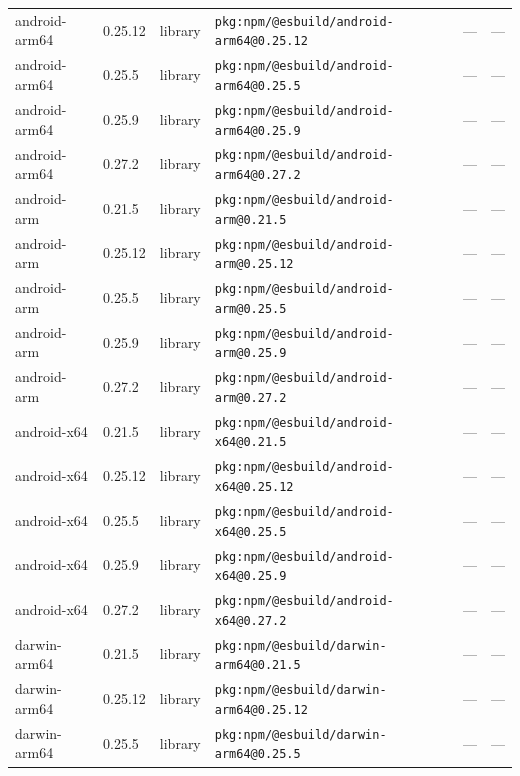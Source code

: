 \documentclass[11pt,a4paper]{article}
\begin{document}
\begin{longtable}{|p{4cm}|p{2cm}|p{1.6cm}|p{5cm}|p{1.5cm}|p{3.5cm}|}
\raggedright android-arm64 & 0.25.12 & library & \small\texttt{pkg:npm/@esbuild/android-arm64@0.25.12} & — & \small — \\
\raggedright android-arm64 & 0.25.5 & library & \small\texttt{pkg:npm/@esbuild/android-arm64@0.25.5} & — & \small — \\
\raggedright android-arm64 & 0.25.9 & library & \small\texttt{pkg:npm/@esbuild/android-arm64@0.25.9} & — & \small — \\
\raggedright android-arm64 & 0.27.2 & library & \small\texttt{pkg:npm/@esbuild/android-arm64@0.27.2} & — & \small — \\
\raggedright android-arm & 0.21.5 & library & \small\texttt{pkg:npm/@esbuild/android-arm@0.21.5} & — & \small — \\
\raggedright android-arm & 0.25.12 & library & \small\texttt{pkg:npm/@esbuild/android-arm@0.25.12} & — & \small — \\
\raggedright android-arm & 0.25.5 & library & \small\texttt{pkg:npm/@esbuild/android-arm@0.25.5} & — & \small — \\
\raggedright android-arm & 0.25.9 & library & \small\texttt{pkg:npm/@esbuild/android-arm@0.25.9} & — & \small — \\
\raggedright android-arm & 0.27.2 & library & \small\texttt{pkg:npm/@esbuild/android-arm@0.27.2} & — & \small — \\
\raggedright android-x64 & 0.21.5 & library & \small\texttt{pkg:npm/@esbuild/android-x64@0.21.5} & — & \small — \\
\raggedright android-x64 & 0.25.12 & library & \small\texttt{pkg:npm/@esbuild/android-x64@0.25.12} & — & \small — \\
\raggedright android-x64 & 0.25.5 & library & \small\texttt{pkg:npm/@esbuild/android-x64@0.25.5} & — & \small — \\
\raggedright android-x64 & 0.25.9 & library & \small\texttt{pkg:npm/@esbuild/android-x64@0.25.9} & — & \small — \\
\raggedright android-x64 & 0.27.2 & library & \small\texttt{pkg:npm/@esbuild/android-x64@0.27.2} & — & \small — \\
\raggedright darwin-arm64 & 0.21.5 & library & \small\texttt{pkg:npm/@esbuild/darwin-arm64@0.21.5} & — & \small — \\
\raggedright darwin-arm64 & 0.25.12 & library & \small\texttt{pkg:npm/@esbuild/darwin-arm64@0.25.12} & — & \small — \\
\raggedright darwin-arm64 & 0.25.5 & library & \small\texttt{pkg:npm/@esbuild/darwin-arm64@0.25.5} & — & \small — \\

\end{longtable}
\end{document}
